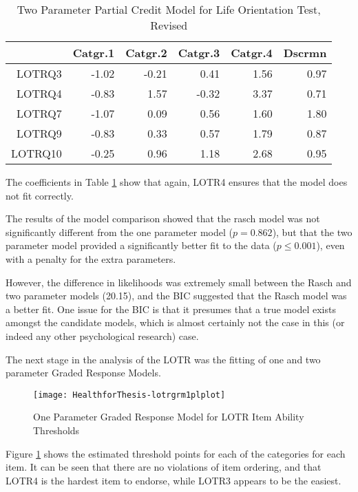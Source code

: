 \documentclass{article}
\begin{document}
\begin{table}[ht]
\centering
\begin{tabular}{rrrrrr}
  \hline
 & Catgr.1 & Catgr.2 & Catgr.3 & Catgr.4 & Dscrmn \\ 
  \hline
LOTRQ3 & -1.02 & -0.21 & 0.41 & 1.56 & 0.97 \\ 
  LOTRQ4 & -0.83 & 1.57 & -0.32 & 3.37 & 0.71 \\ 
  LOTRQ7 & -1.07 & 0.09 & 0.56 & 1.60 & 1.80 \\ 
  LOTRQ9 & -0.83 & 0.33 & 0.57 & 1.79 & 0.87 \\ 
  LOTRQ10 & -0.25 & 0.96 & 1.18 & 2.68 & 0.95 \\ 
   \hline
\end{tabular}
\caption{Two Parameter Partial Credit Model for Life Orientation Test, Revised} 
\label{tab:lotrpcmgpcm}
\end{table}
The coefficients in Table \ref{tab:lotrpcmgpcm} show that again, LOTR4 ensures that the model does not fit correctly. 


The results of the model comparison showed that the rasch model was not significantly different from the one parameter model ($p=0.862$), but that the two parameter model provided a significantly better fit to the data ($p \le 0.001$), even with a penalty for the extra parameters.

However, the difference in likelihoods was extremely small between the Rasch and two parameter models (20.15), and the BIC suggested that the Rasch model was a better fit.  One issue for the BIC is that it presumes that a true model exists amongst the candidate models, which is almost certainly not the case in this (or indeed any other psychological research) case.

The next stage in the analysis of the LOTR was the fitting of one and two parameter Graded Response Models. 

\begin{figure}
\texttt{[image: HealthforThesis-lotrgrm1plplot]}
  \caption{One Parameter Graded Response Model for LOTR Item Ability Thresholds}
  \label{fig:lotr1plgrm}
\end{figure}

Figure \ref{fig:lotr1plgrm} shows the estimated threshold points for each of the categories for each item. It can be seen that there are no violations of item ordering, and that LOTR4 is the hardest item to endorse, while LOTR3 appears to be the easiest. 
\end{document}
